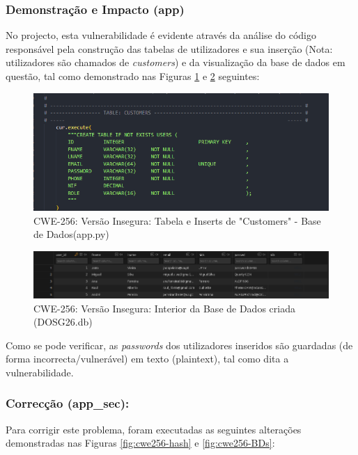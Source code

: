 \subsubsection{Demonstração e Impacto (app)}
No projecto, esta vulnerabilidade é evidente através da análise do código responsável pela construção das tabelas de utilizadores e sua inserção (Nota: utilizadores são chamados de \textit{customers}) e da visualização da base de dados em questão, tal como demonstrado nas Figuras \ref{fig:cwe256-cod1s} e \ref{fig:cwe256-BDv} seguintes:

\begin{figure}[H]
  \centering
  \includegraphics[width=16cm]{images/CWE-256-cod1v.png}
  \caption{CWE-256: Versão Insegura: Tabela e Inserts de "Customers" - Base de Dados(app.py)}
  \label{fig:cwe256-cod1s}
\end{figure}

\begin{figure}[H]
  \centering
  \includegraphics[width=16cm]{images/CWE-256-BDv.png}
  \caption{CWE-256: Versão Insegura: Interior da Base de Dados criada (DOSG26.db)}
  \label{fig:cwe256-BDv}
\end{figure}

Como se pode verificar, as \textit{passwords} dos utilizadores inseridos são guardadas (de forma incorrecta/vulnerável) em texto (plaintext), tal como dita a vulnerabilidade.

\subsubsection{Correcção (app\_sec):}
Para corrigir este problema, foram executadas as seguintes alterações demonstradas nas Figuras \ref{fig:cwe256-hash} e \ref{fig:cwe256-BDs}:

